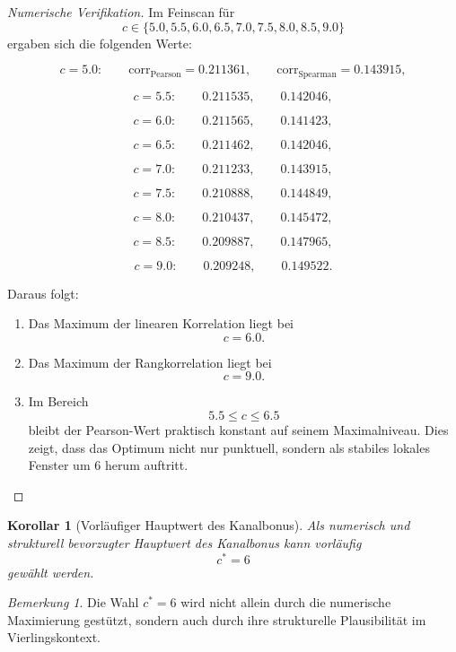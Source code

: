 \documentclass[11pt,a4paper]{article}
\newtheorem{korollar}[satz]{Korollar}
\theoremstyle{definition}
\theoremstyle{remark}
\newtheorem{bemerkung}[satz]{Bemerkung}
\begin{document}
	\begin{proof}[Numerische Verifikation]
		Im Feinscan für
		\[
		c\in\{5.0,5.5,6.0,6.5,7.0,7.5,8.0,8.5,9.0\}
		\]
		ergaben sich die folgenden Werte:
		
		\[
		c=5.0:
		\qquad
		\mathrm{corr}_{\mathrm{Pearson}}=0.211361,
		\qquad
		\mathrm{corr}_{\mathrm{Spearman}}=0.143915,
		\]
		
		\[
		c=5.5:
		\qquad
		0.211535,
		\qquad
		0.142046,
		\]
		
		\[
		c=6.0:
		\qquad
		0.211565,
		\qquad
		0.141423,
		\]
		
		\[
		c=6.5:
		\qquad
		0.211462,
		\qquad
		0.142046,
		\]
		
		\[
		c=7.0:
		\qquad
		0.211233,
		\qquad
		0.143915,
		\]
		
		\[
		c=7.5:
		\qquad
		0.210888,
		\qquad
		0.144849,
		\]
		
		\[
		c=8.0:
		\qquad
		0.210437,
		\qquad
		0.145472,
		\]
		
		\[
		c=8.5:
		\qquad
		0.209887,
		\qquad
		0.147965,
		\]
		
		\[
		c=9.0:
		\qquad
		0.209248,
		\qquad
		0.149522.
		\]
		
		Daraus folgt:
		
		\begin{enumerate}
			\item Das Maximum der linearen Korrelation liegt bei
			\[
			\boxed{c=6.0.}
			\]
			
			\item Das Maximum der Rangkorrelation liegt bei
			\[
			\boxed{c=9.0.}
			\]
			
			\item Im Bereich
			\[
			5.5\le c\le 6.5
			\]
			bleibt der Pearson-Wert praktisch konstant auf seinem Maximalniveau. Dies zeigt, dass
			das Optimum nicht nur punktuell, sondern als stabiles lokales Fenster um \(6\) herum
			auftritt.
		\end{enumerate}
	\end{proof}
	
	\begin{korollar}[Vorläufiger Hauptwert des Kanalbonus]
		\label{kor:hauptwert_kanalbonus}
		Als numerisch und strukturell bevorzugter Hauptwert des Kanalbonus kann vorläufig
		\[
		\boxed{c^*=6}
		\]
		gewählt werden.
	\end{korollar}
	
	\begin{bemerkung}
		Die Wahl \(c^*=6\) wird nicht allein durch die numerische Maximierung gestützt, sondern
		auch durch ihre strukturelle Plausibilität im Vierlingskontext.
	\end{bemerkung}
	
\end{document}
